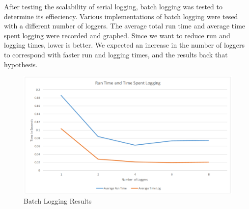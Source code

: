 After testing the scalability of serial logging, batch logging was tested to determine its effieciency. Various implementations of batch logging were tesed with a different number of loggers. The average total run time and average time spent logging were recorded and graphed. Since we want to reduce run and logging times, lower is better. We expected an increase in the number of loggers to correspond with faster run and logging times, and the results back that hypothesis.
\begin{figure}
    \caption{Batch Logging Results}
    \includegraphics[width=\textwidth]{BatchLoggingResults.png}
\end{figure}
